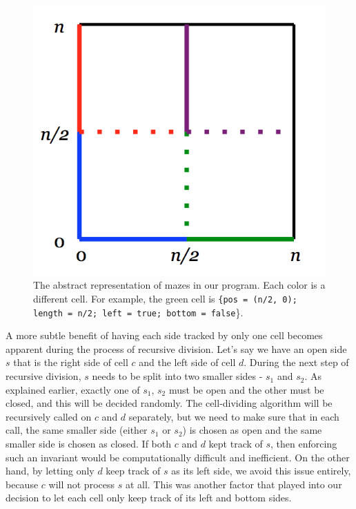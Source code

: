 \documentclass[11pt, margin=1in]{article}
\begin{document}
\begin{figure}[H]
\begin{center}
\includegraphics[scale=0.7]{structure.jpg}
\caption{The abstract representation of mazes in our program.  Each color is a different cell.  For example, the green cell is \texttt{\{pos = (n/2, 0); length = n/2; left = true; bottom = false}\}.}
\end{center}
\end{figure}

A more subtle benefit of having each side tracked by only one cell becomes apparent during the process of recursive division.  Let's say we have an open side $s$ that is the right side of cell $c$ and the left side of cell $d$.  During the next step of recursive division, $s$ needs to be split into two smaller sides - $s_1$ and $s_2$.  As explained earlier, exactly one of $s_1$, $s_2$ must be open and the other must be closed, and this will be decided randomly.  The cell-dividing algorithm will be recursively called on $c$ and $d$ separately, but we need to make sure that in each call, the same smaller side (either $s_1$ or $s_2$) is chosen as open and the same smaller side is chosen as closed.  If both $c$ and $d$ kept track of $s$, then enforcing such an invariant would be computationally difficult and inefficient.  On the other hand, by letting only $d$ keep track of $s$ as its left side, we avoid this issue entirely, because $c$ will not process $s$ at all.  This was another factor that played into our decision to let each cell only keep track of its left and bottom sides.    
\end{document}
